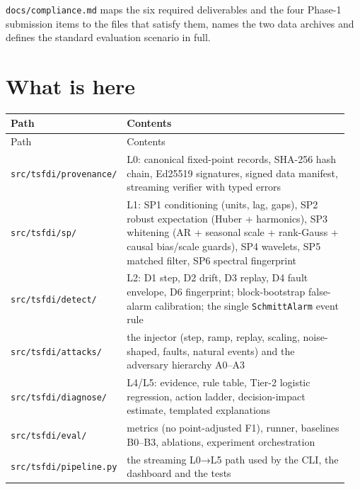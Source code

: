 \documentclass[10pt,a4paper]{article}
\begin{document}
\texttt{docs/\allowbreak{}compliance.md} maps the six required deliverables and the four Phase-\allowbreak{}1 submission items to the files that satisfy them, names the two data archives and defines the standard evaluation scenario in full.

\section*{What is here}
{\small
\setlength{\tabcolsep}{4.5pt}
\setlength{\LTleft}{\fill}
\setlength{\LTright}{\fill}
\begin{longtable}{>{\raggedright\arraybackslash}p{0.209\linewidth}>{\raggedright\arraybackslash}p{0.744\linewidth}}
\toprule
Path & Contents \\
\midrule
\endfirsthead
\toprule
Path & Contents \\
\midrule
\endhead
\bottomrule
\endlastfoot
\texttt{src/\allowbreak{}tsfdi/\allowbreak{}provenance/\allowbreak{}} & L0: canonical fixed-\allowbreak{}point records, SHA-\allowbreak{}256 hash chain, Ed25519 signatures, signed data manifest, streaming verifier with typed errors \\
\texttt{src/\allowbreak{}tsfdi/\allowbreak{}sp/\allowbreak{}} & L1: SP1 conditioning (units, lag, gaps), SP2 robust expectation (Huber + harmonics), SP3 whitening (AR + seasonal scale + rank-\allowbreak{}Gauss + causal bias/\allowbreak{}scale guards), SP4 wavelets, SP5 matched filter, SP6 spectral fingerprint \\
\texttt{src/\allowbreak{}tsfdi/\allowbreak{}detect/\allowbreak{}} & L2: D1 step, D2 drift, D3 replay, D4 fault envelope, D6 fingerprint; block-\allowbreak{}bootstrap false-\allowbreak{}alarm calibration; the single \texttt{SchmittAlarm} event rule \\
\texttt{src/\allowbreak{}tsfdi/\allowbreak{}attacks/\allowbreak{}} & the injector (step, ramp, replay, scaling, noise-\allowbreak{}shaped, faults, natural events) and the adversary hierarchy A0–A3 \\
\texttt{src/\allowbreak{}tsfdi/\allowbreak{}diagnose/\allowbreak{}} & L4/\allowbreak{}L5: evidence, rule table, Tier-\allowbreak{}2 logistic regression, action ladder, decision-\allowbreak{}impact estimate, templated explanations \\
\texttt{src/\allowbreak{}tsfdi/\allowbreak{}eval/\allowbreak{}} & metrics (no point-\allowbreak{}adjusted F1), runner, baselines B0–B3, ablations, experiment orchestration \\
\texttt{src/\allowbreak{}tsfdi/\allowbreak{}pipeline.py} & the streaming L0→L5 path used by the CLI, the dashboard and the tests \\

\end{longtable}}
\end{document}
